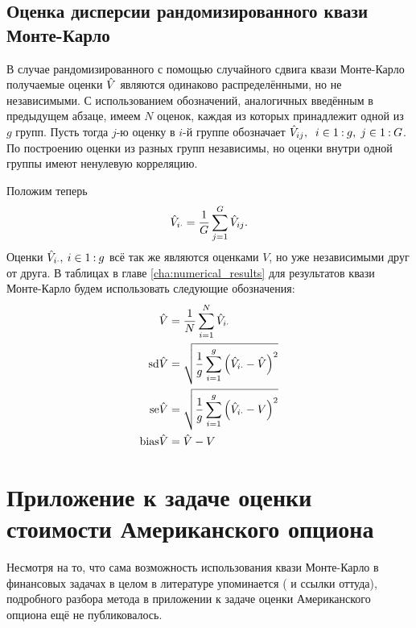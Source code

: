\subsection{Оценка дисперсии рандомизированного квази Монте-Карло} %
\label{ssub:qmc:randomization:variance_estimation}

В случае рандомизированного с помощью случайного сдвига квази Монте-Карло получаемые оценки $\hat{V}$ являются одинаково распределёнными, но не независимыми. С использованием обозначений, аналогичных введённым в предыдущем абзаце, имеем $N$ оценок, каждая из которых принадлежит одной из $g$ групп. Пусть тогда $j$-ю оценку в $i$-й группе обозначает $\hat{V}_{ij},\;\;i\in{1\mathbin{:}g},\;j \in{1\mathbin{:}G}$. По построению оценки из разных групп независимы, но оценки внутри одной группы имеют ненулевую корреляцию. 

Положим теперь 
$$\hat{V}_{i\cdot} = \frac{1}{G}\sum_{j=1}^G \hat{V}_{ij}.$$
Оценки $\hat{V}_{i\cdot},\:i\in{1\mathbin{:}g}$ всё так же являются оценками $V$, но уже независимыми друг от друга. В таблицах в главе \ref{cha:numerical_results} для результатов квази Монте-Карло будем использовать следующие обозначения:
\begin{equation}\label{eq:rqmc_variance_estimation}
\begin{aligned}
    \hat{V} &= \frac{1}{N}\sum_{i=1}^N \hat{V}_{i\cdot} \\
    \mathrm{sd}\hat{V} &= \sqrt{\frac{1}{g}\sum_{i=1}^g \left(\hat{V}_{i\cdot} - \hat{V}\right)^2} \\
    \mathrm{se}\hat{V} &= \sqrt{\frac{1}{g}\sum_{i=1}^g \left(\hat{V}_{i\cdot} - V\right)^2} \\
    \mathrm{bias}\hat{V} &= \hat{V} - V
\end{aligned}
\end{equation}


\section{Приложение к задаче оценки стоимости Американского опциона} %
\label{sec:qmc:monte_carlo_in_option_pricing}

Несмотря на то, что сама возможность использования квази Монте-Карло в финансовых задачах в целом в литературе упоминается (\cite[глава~5]{Glasserman2004} и ссылки оттуда), подробного разбора метода в приложении к задаче оценки Американского опциона ещё не публиковалось.

